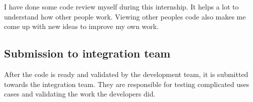 I have done some code review myself during this internship. It helps a lot to
understand how other people work. Viewing other peoples code also makes me come
up with new ideas to improve my own work.

\subsection{Submission to integration team}
After the code is ready and validated by the development team, it is submitted towards the integration team.
They are responsible for testing complicated uses cases and validating the work the developers did.

